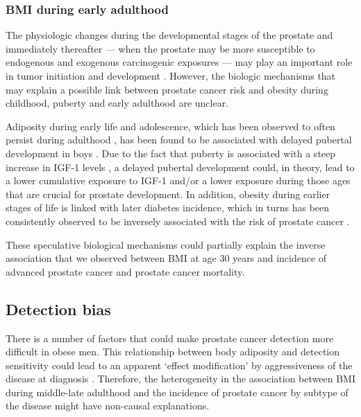 \subsubsection{BMI during early adulthood}

The physiologic changes during the developmental stages of the prostate and immediately thereafter --- when the prostate may be more susceptible to endogenous and exogenous carcinogenic exposures --- may play an important role in tumor initiation and development \citep{hsing_hormones_1996, giovannucci_height_1997, sutcliffe_prostate_2013}. However, the biologic mechanisms that may explain a possible link between prostate cancer risk and obesity during childhood, puberty and early adulthood are unclear.

Adiposity during early life and adolescence, which has been observed to often persist during adulthood \citep{the_association_2010}, has been found to be associated with delayed pubertal development in boys \citep{wang_obesity_2002}. %
Due to the fact that puberty is associated with a steep increase in IGF-1 levels \citep{keenan_androgenstimulated_1993, juul_serum_1994}, a delayed  pubertal development could, in theory, lead to a lower cumulative exposure to IGF-1 and/or a lower exposure during those ages that are crucial for prostate development. In addition, obesity during earlier stages of life is linked with later diabetes incidence, which in turns has been consistently observed to be inversely associated with the risk of prostate cancer \citep{jiangang_diabetes_2015}. 

These speculative biological mechanisms could partially explain the inverse association that we observed between BMI at age 30 years and incidence of advanced prostate cancer and prostate cancer mortality. 

\subsection{Detection bias}


There is a number of factors that could make prostate cancer detection more difficult in obese men. This relationship between body adiposity and detection sensitivity could lead to an apparent `effect modification' by aggressiveness of the disease at diagnosis \citep{garcia-closas_invited_2015}. Therefore, the heterogeneity in the association between BMI during middle-late adulthood and the incidence of prostate cancer by subtype of the disease might have non-causal explanations.

